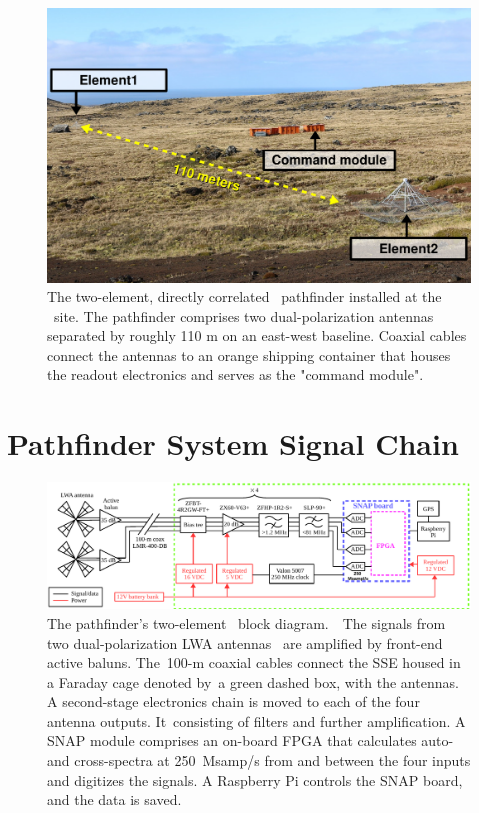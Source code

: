 \begin{figure}
	\centering
	\includegraphics[width=\linewidth]{Figures/Albatros}
	\caption{The two-element, directly correlated \albatros\ pathfinder installed at the \prizm\ site. The pathfinder comprises two dual-polarization antennas separated by roughly 110 m on an east-west baseline. Coaxial cables connect the antennas to an orange shipping container that houses the readout electronics and serves as the "command module".}
	\label{Fig:albatros2}
\end{figure}

\section{Pathfinder System Signal Chain}

\begin{figure}
	\begin{center} \includegraphics[width=\linewidth]{Figures/pathfinder_schematic.pdf}
		\caption{The pathfinder's two-element \albatros\ block diagram.  The signals from two dual-polarization LWA antennas~\citep{2012PASP..124.1090H} are amplified by front-end active baluns. The 100-m coaxial cables connect the SSE housed in a Faraday cage denoted by a green dashed box, with the antennas. A second-stage electronics chain is moved to each of the four antenna outputs. It consisting of filters and further amplification. A SNAP module comprises an on-board FPGA that calculates auto- and cross-spectra at 250~Msamp/s from and between the four inputs and digitizes the signals. A Raspberry Pi controls the SNAP board, and the data is saved.}
		\label{Fig:albatros2_schem}
	\end{center}
\end{figure}

